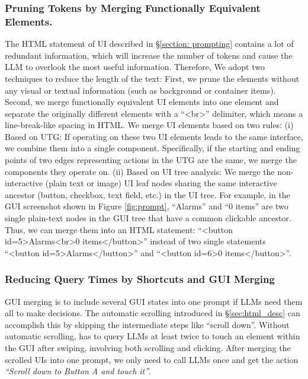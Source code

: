 \subsubsection{Pruning Tokens by Merging Functionally Equivalent Elements.}
The HTML statement of UI described in \S \ref{section: prompting} contains a lot of redundant information, which will increase the number of tokens and cause the LLM to overlook the most useful information. Therefore, We adopt two techniques to reduce the length of the text:
First, we prune the elements without any visual or textual information (such as background or container items). %
Second, we merge functionally equivalent UI elements into one element and separate the originally different elements with a ``<br>'' delimiter, which means a line-break-like spacing in HTML. 
We merge UI elements based on two rules: (i) Based on UTG: If operating on these two UI elements leads to the same interface, we combine them into a single component. Specifically, if the starting and ending points of two edges representing actions in the UTG are the same, we merge the components they operate on. 
(ii) Based on UI tree analysis: We merge the non-interactive (plain text or image) UI leaf nodes sharing the same interactive ancestor (button, checkbox, text field, etc.) in the UI tree. 
For example, in the GUI screenshot shown in Figure \ref{fig:prompt}, ``Alarms'' and ``0 items'' are two single plain-text nodes in the GUI tree that have a common clickable ancestor. 
Thus, we can merge them into an HTML statement: ``<button id=5>Alarms<br>0 items</button>'' instead of two single statements ``<button id=5>Alarms</button>'' and ``<button id=6>0 items</button>''.

\subsubsection{Reducing Query Times by Shortcuts and GUI Merging}

GUI merging is to include several GUI states into one prompt if LLMs need them all to make decisions. 
The automatic scrolling introduced in \S \ref{sec:html_desc} can accomplish this by skipping the intermediate steps like ``scroll down''. 
Without automatic scrolling, \name has to query LLMs at least twice to touch an element within the GUI after swiping, involving both scrolling and clicking. After merging the scrolled UIs into one prompt, we only need to call LLMs once and get the action \textit{``Scroll down to Button A and touch it''}. 

